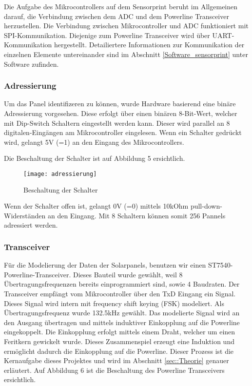 Die Aufgabe des Mikrocontrollers auf dem Sensorprint beruht im Allgemeinen darauf, die Verbindung zwischen dem ADC und dem Powerline Transceiver herzustellen. Die Verbindung zwischen Mikrocontroller und ADC funktioniert mit SPI-Kommunikation. Diejenige zum Powerline Transceiver wird über UART-Kommunikation hergestellt. Detailiertere Informationen zur Kommunikation der einzelnen Elemente untereinander sind im Abschnitt \ref{Software_sensorprint} unter Software zufinden.


\clearpage

\subsubsection{Adressierung}
Um das Panel identifizeren zu können, wurde Hardware basierend eine binäre Adressierung vorgesehen. Diese erfolgt über einen binären 8-Bit-Wert, welcher mit Dip-Switch Schaltern eingestellt werden kann. Dieser wird parallel an 8 digitalen-Eingängen am Mikrocontroller eingelesen. Wenn ein Schalter gedrückt wird, gelangt 5V (=1) an den Eingang des Mikrocontrollers.

Die Beschaltung der Schalter ist auf Abbildung 5 ersichtlich.

\begin{figure}[h]
\centering
\texttt{[image: adressierung]}
\caption{Beschaltung der Schalter}
\end{figure}

 Wenn der Schalter offen ist, gelangt 0V (=0) mittels 10kOhm pull-down-Widerständen an den Eingang. Mit 8 Schaltern können somit 256 Pannels adressiert werden.
 
\clearpage

\subsubsection{Transceiver}
Für die Modelierung der Daten der Solarpanels, benutzen wir einen ST7540-Powerline-Transceiver. Dieses Bauteil wurde gewählt, weil 8 Übertragungsfrequenzen bereits einprogrammiert sind, sowie 4 Baudraten. Der Transceiver empfängt vom Mikrocontroller über den TxD Eingang ein Signal. Dieses Signal wird intern mit frequency shift keying (FSK) modeliert. Als Übertragungsfrequenz wurde 132.5kHz gewählt. Das modelierte Signal wird an den Ausgang übertragen und mittels induktiver Einkopplung auf die Powerline eingekoppelt. Die Einkopplung erfolgt mittels einem Draht, welcher um einen Feritkern gewickelt wurde. Dieses Zusammenspiel erzeugt eine Induktion und ermöglicht dadurch die Einkopplung auf die Powerline. Dieser Prozess ist die Kernaufgabe dieses Projektes und wird im Abschnitt \ref{sec::Theorie} genauer erläutert. Auf Abbildung 6 ist die Beschaltung des Powerline Transceivers ersichtlich.

